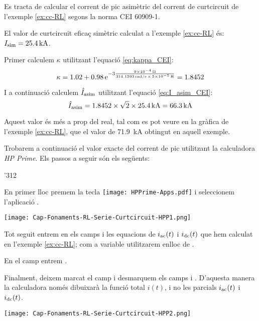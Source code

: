 \begin{exemple}\label{ex:corrent-pic}
    Es tracta de calcular el corrent de pic asimètric del corrent de curtcircuit de l'exemple \ref{ex:cc-RL} segons la norma CEI 60909-1.

    El valor de curtcircuit eficaç simètric calculat a l'exemple \vref{ex:cc-RL} és: $I_\mathrm{sim}= \SI{25,4}{kA}$.

    Primer calculem $\kappa$ utilitzant l'equació \eqref{eq:kappa_CEI}:
    \[
    \kappa = \num{1,02} + \num{0,98} \,\mathrm{e}^{-3\frac{\SI{9e-4}{\ohm}}{\SI{314,1593}{rad/s}\, \times\, \SI{5e-5}{H}}} = \num{1,8452}
    \]

    I a continuació calculem $\hat{I}_\mathrm{asim}$ utilitzant l'equació \eqref{eq:I_asim_CEI}:
    \[
    \hat{I}_\mathrm{asim} = \num{1,8452} \times \sqrt{2} \times \SI{25,4}{kA} = \SI{66,3}{kA}
    \]

    Aquest valor és més a prop del real, tal com es pot veure en la gràfica de l'exemple  \ref{ex:cc-RL}, que el valor de  \SI{71,9}{kA} obtingut en aquell exemple.

    Trobarem a continuació el valor exacte  del corrent de pic utilitzant la calculadora  \emph{HP Prime}.
     Els passos a seguir són els següents:

     \begin{dingautolist}{'312}

        \item En primer lloc premem la tecla \texttt{[image: HPPrime-Apps.pdf]} i seleccionem l'aplicació .

             \texttt{[image: Cap-Fonaments-RL-Serie-Curtcircuit-HPP1.png]}

        \item Tot seguit entrem en els camps  i  les equacions de $i_\mathrm{ac}(t)$ i $i_\mathrm{dc}(t)$ que hem calculat en l'exemple \vref{ex:cc-RL}; com a variable utilitzarem  enlloc de .

            En el camp  entrem .

            Finalment, deixem marcat el camp  i desmarquem els camps  i . D'aquesta manera la calculadora només dibuixarà la funció total $i(t)$, i no les parcials $i_\mathrm{ac}(t)$ i $i_\mathrm{dc}(t)$.


            \texttt{[image: Cap-Fonaments-RL-Serie-Curtcircuit-HPP2.png]}


\end{dingautolist}
\end{exemple}
